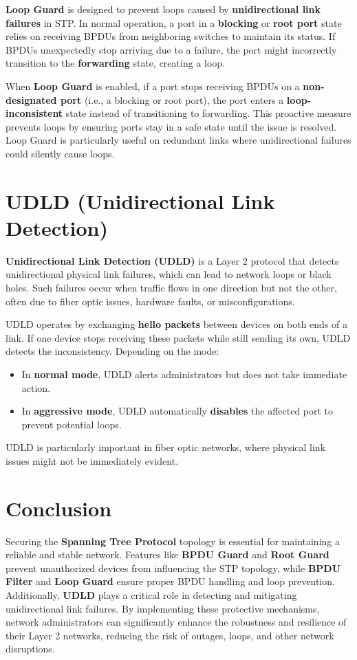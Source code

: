 \documentclass[a4paper]{book}
\begin{document}
\textbf{Loop Guard} is designed to prevent loops caused by \textbf{unidirectional link failures} in STP. In normal operation, a port in a \textbf{blocking} or \textbf{root port} state relies on receiving BPDUs from neighboring switches to maintain its status. If BPDUs unexpectedly stop arriving due to a failure, the port might incorrectly transition to the \textbf{forwarding} state, creating a loop.

When \textbf{Loop Guard} is enabled, if a port stops receiving BPDUs on a \textbf{non-designated port} (i.e., a blocking or root port), the port enters a \textbf{loop-inconsistent} state instead of transitioning to forwarding. This proactive measure prevents loops by ensuring ports stay in a safe state until the issue is resolved. Loop Guard is particularly useful on redundant links where unidirectional failures could silently cause loops.

\section*{UDLD (Unidirectional Link Detection)}

\textbf{Unidirectional Link Detection (UDLD)} is a Layer 2 protocol that detects unidirectional physical link failures, which can lead to network loops or black holes. Such failures occur when traffic flows in one direction but not the other, often due to fiber optic issues, hardware faults, or misconfigurations.

UDLD operates by exchanging \textbf{hello packets} between devices on both ends of a link. If one device stops receiving these packets while still sending its own, UDLD detects the inconsistency. Depending on the mode:
\begin{itemize}
	\item In \textbf{normal mode}, UDLD alerts administrators but does not take immediate action.
	\item In \textbf{aggressive mode}, UDLD automatically \textbf{disables} the affected port to prevent potential loops.
\end{itemize}

UDLD is particularly important in fiber optic networks, where physical link issues might not be immediately evident.

\section*{Conclusion}

Securing the \textbf{Spanning Tree Protocol} topology is essential for maintaining a reliable and stable network. Features like \textbf{BPDU Guard} and \textbf{Root Guard} prevent unauthorized devices from influencing the STP topology, while \textbf{BPDU Filter} and \textbf{Loop Guard} ensure proper BPDU handling and loop prevention. Additionally, \textbf{UDLD} plays a critical role in detecting and mitigating unidirectional link failures. By implementing these protective mechanisms, network administrators can significantly enhance the robustness and resilience of their Layer 2 networks, reducing the risk of outages, loops, and other network disruptions.
\end{document}
